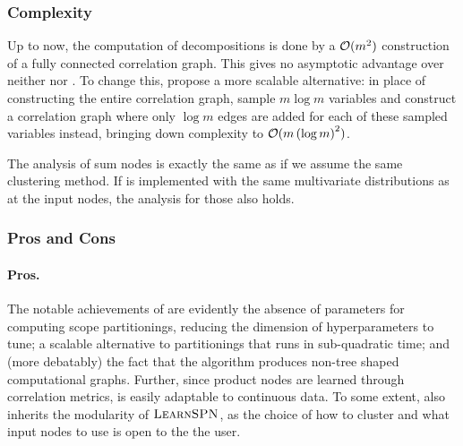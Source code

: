 \subsubsection{Complexity}

Up to now, the computation of decompositions is done by a $\mathcal{O}(m^2)$ construction of a fully
connected correlation graph. This gives  no asymptotic advantage over neither
 nor . To change this, \citeauthor{jaini18a} propose a more
scalable alternative: in place of constructing the entire correlation graph, sample $m\log m$
variables and construct a correlation graph where only $\log m$ edges are added for each of these
sampled variables instead, bringing down complexity to $\mathcal{O}(m\left(\log m\right)^2)$.

The analysis of sum nodes is exactly the same as  if we assume the same
clustering method. If  is implemented with the same multivariate distributions
as  at the input nodes, the analysis for those also holds.

\subsubsection{Pros and Cons}

\paragraph{Pros.} The notable achievements of  are evidently the absence of
parameters for computing scope partitionings, reducing the dimension of hyperparameters to tune; a
scalable alternative to partitionings that runs in sub-quadratic time; and (more debatably) the
fact that the algorithm produces non-tree shaped computational graphs. Further, since product nodes
are learned through correlation metrics,  is easily adaptable to continuous
data. To some extent,  also inherits the modularity of $\textproc{LearnSPN}$,
as the choice of how to cluster and what input nodes to use is open to the the user.


